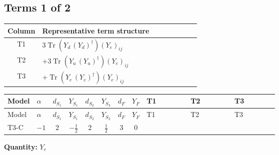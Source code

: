 \documentclass[8pt]{article}
\begin{document}
\begin{landscape}
\subsection*{Terms 1 of 2}
\begin{center}
\begin{tabular}{@{}c >{\raggedright\arraybackslash}p{0.82\linewidth}@{}}
\toprule
Column & Representative term structure \\
\midrule
T1 & \(\displaystyle 3 \operatorname{Tr}\!\left({Y_d}\,\left({Y_d}\right)^{\dagger}\right) \left({Y_e}\right)_{ij}\) \\
\midrule
T2 & \(\displaystyle +3 \operatorname{Tr}\!\left({Y_u}\,\left({Y_u}\right)^{\dagger}\right) \left({Y_e}\right)_{ij}\) \\
\midrule
T3 & \(\displaystyle +\operatorname{Tr}\!\left({Y_e}\,\left({Y_e}\right)^{\dagger}\right) \left({Y_e}\right)_{ij}\) \\
\midrule
\bottomrule
\end{tabular}
\end{center}
\smallskip
\tiny
\begin{longtable}{@{}llcccccc >{\raggedright\arraybackslash}p{0.21\linewidth} >{\raggedright\arraybackslash}p{0.21\linewidth} >{\raggedright\arraybackslash}p{0.21\linewidth}@{}}
\toprule
Model & $\alpha$ & $d_{S_1}$ & $Y_{S_1}$ & $d_{S_2}$ & $Y_{S_2}$ & $d_F$ & $Y_F$ & T1 & T2 & T3 \\
\midrule
\endfirsthead
\toprule
Model & $\alpha$ & $d_{S_1}$ & $Y_{S_1}$ & $d_{S_2}$ & $Y_{S_2}$ & $d_F$ & $Y_F$ & T1 & T2 & T3 \\
\midrule
\endhead
T3-C & $-1$ & $2$ & $-\frac{1}{2}$ & $2$ & $\frac{1}{2}$ & $3$ & $0$ & \scriptsize\adjustbox{max width=\linewidth}{$\begin{gathered} 3 \operatorname{Tr}\!\left({Y_d}\,\left({Y_d}\right)^{\dagger}\right) \left({Y_e}\right)_{ij}\end{gathered}$} & \scriptsize\adjustbox{max width=\linewidth}{$\begin{gathered} +3 \operatorname{Tr}\!\left({Y_u}\,\left({Y_u}\right)^{\dagger}\right) \left({Y_e}\right)_{ij}\end{gathered}$} & \scriptsize\adjustbox{max width=\linewidth}{$\begin{gathered} +\operatorname{Tr}\!\left({Y_e}\,\left({Y_e}\right)^{\dagger}\right) \left({Y_e}\right)_{ij}\end{gathered}$} \\
\midrule
\bottomrule
\end{longtable}
\clearpage
\noindent\textbf{Quantity: }$Y_e$\par\smallskip

\end{landscape}
\end{document}

